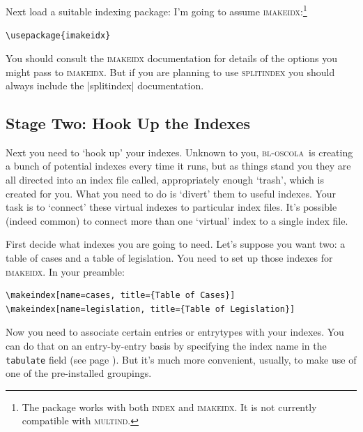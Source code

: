 \documentclass[a4paper,
               11pt,
	       DIV=1,			   
	       footinclude=false]
	      {scrartcl}
\newcommand{\oscola}{\textsc{bl-oscola}}
\newcounter{egcounter}\setcounter{egcounter}{0}
\newlength{\boxwidth}
\newenvironment{bibexample}[1][]
{%
  \medskip\par\noindent\ignorespaces
  \marginpar{[\refstepcounter{egcounter}\arabic{egcounter}]\label{#1}}%
  \setlength{\boxwidth}{0.95\linewidth}%
  \addtolength{\boxwidth}{-2\fboxsep}
  \addtolength{\boxwidth}{-2\fboxrule}
  \begin{lrbox}{\boxcontainer}
  \begin{minipage}[t]{\boxwidth}%
}
{%
  \end{minipage}\end{lrbox}%
  \colorbox{gray!30}{\usebox{\boxcontainer}}
  \par\medskip}
\begin{document}
Next load a suitable indexing package: I'm going to assume \textsc{imakeidx}:\footnote{The package works with both \textsc{index} and \textsc{imakeidx}. It is not currently compatible with \textsc{multind}.}
\begin{center}
\verb|\usepackage{imakeidx}|
\end{center}
You should consult the \textsc{imakeidx} documentation for details of
the options you might pass to \textsc{imakeidx}. But if you are
planning to use \textsc{splitindex} you should always include the
|splitindex| documentation.

\subsection{Stage Two: Hook Up the Indexes}

Next you need to `hook up' your indexes. Unknown to you, \oscola\ is
creating a bunch of potential indexes every time it runs, but as
things stand you they are all directed into an index file called,
appropriately enough `trash', which is created for you. What you need
to do is `divert' them to useful indexes. Your task is to `connect'
these virtual indexes to particular index files. It's possible (indeed
common) to connect more than one `virtual' index to a single index
file.

First decide what indexes you are going to need. Let's suppose you
want two: a table of cases and a table of legislation. You need to set
up those indexes for \textsc{imakeidx}. In your preamble:

\begin{bibexample}[makeindex]
\begin{verbatim}
\makeindex[name=cases, title={Table of Cases}]
\makeindex[name=legislation, title={Table of Legislation}]
\end{verbatim}
\end{bibexample}

Now you need to associate certain entries or entrytypes with your
indexes. You can do that on an entry-by-entry basis by specifying the
index name in the \verb|tabulate| field (see page \pageref{tabulate}). But it's much more convenient,
usually, to make use of one of the pre-installed groupings.
\end{document}

